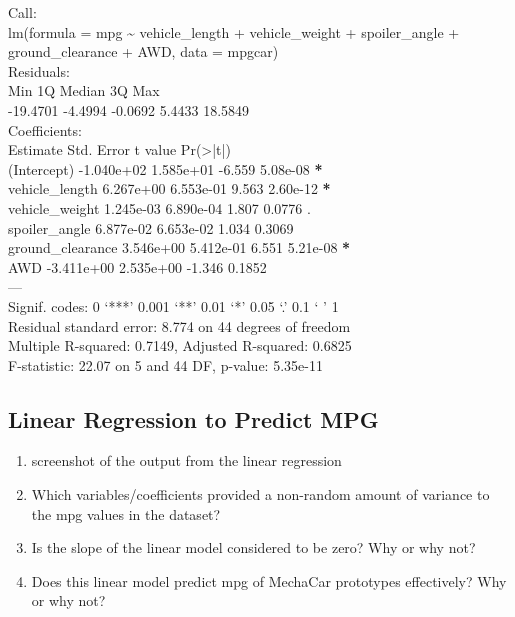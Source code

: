 \documentclass[11pt]{article}
\begin{document}
\begin{org}


Call:\\
lm(formula = mpg \textasciitilde{} vehicle\_length + vehicle\_weight + spoiler\_angle +\\
    ground\_clearance + AWD, data = mpgcar)\\

Residuals:\\
     Min       1Q   Median       3Q      Max\\
-19.4701  -4.4994  -0.0692   5.4433  18.5849\\

Coefficients:\\
                   Estimate Std. Error t value Pr(>|t|)\\
(Intercept)      -1.040e+02  1.585e+01  -6.559 5.08e-08 \textbf{*}\\
vehicle\_length    6.267e+00  6.553e-01   9.563 2.60e-12 \textbf{*}\\
vehicle\_weight    1.245e-03  6.890e-04   1.807   0.0776 .\\
spoiler\_angle     6.877e-02  6.653e-02   1.034   0.3069\\
ground\_clearance  3.546e+00  5.412e-01   6.551 5.21e-08 \textbf{*}\\
AWD              -3.411e+00  2.535e+00  -1.346   0.1852\\
---\\
Signif. codes:  0 ‘***’ 0.001 ‘**’ 0.01 ‘*’ 0.05 ‘.’ 0.1 ‘ ’ 1\\

Residual standard error: 8.774 on 44 degrees of freedom\\
Multiple R-squared:  0.7149,	Adjusted R-squared:  0.6825\\
F-statistic: 22.07 on 5 and 44 DF,  p-value: 5.35e-11\\
\end{org}


\subsection{Linear Regression to Predict MPG}
\label{sec:org5eecd05}

\begin{enumerate}
\item screenshot of the output from the linear regression\\
\item Which variables/coefficients provided a non-random amount of variance to the mpg values in the dataset?\\
\item Is the slope of the linear model considered to be zero? Why or why not?\\
\item Does this linear model predict mpg of MechaCar prototypes effectively? Why or why not?\\
\end{enumerate}
\end{document}
